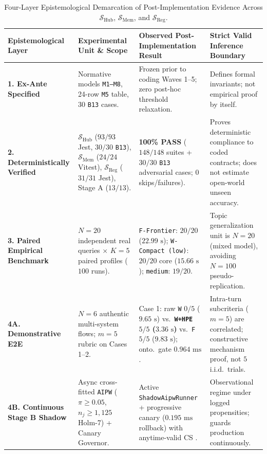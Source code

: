 \documentclass[10pt,twocolumn]{article}
\begin{document}
\begin{table}[t]
\centering
\caption{Four-Layer Epistemological Demarcation of Post-Implementation Evidence Across $\mathcal{S}_{\mathrm{Hub}}$, $\mathcal{S}_{\mathrm{Mem}}$, and $\mathcal{S}_{\mathrm{Reg}}$.}
\label{tab:epistemic}
\footnotesize
\begin{tabularx}{\textwidth}{l p{3.6cm} p{4.2cm} X}
\toprule
\textbf{Epistemological Layer} & \textbf{Experimental Unit \& Scope} & \textbf{Observed Post-Implementation Result} & \textbf{Strict Valid Inference Boundary} \\
\midrule
\textbf{1. Ex-Ante Specified} & Normative models \texttt{M1--M8}, 24-row \texttt{M5} table, 30 \texttt{B13} cases. & Frozen prior to coding Waves 1--5; zero post-hoc threshold relaxation. & Defines formal invariants; not empirical proof by itself. \\
\addlinespace[2pt]
\textbf{2. Deterministically Verified} & $\mathcal{S}_{\mathrm{Hub}}$ ($93/93$ Jest, $30/30$ \texttt{B13}), $\mathcal{S}_{\mathrm{Mem}}$ ($24/24$ Vitest), $\mathcal{S}_{\mathrm{Reg}}$ ($31/31$ Jest), Stage A ($13/13$). & \textbf{100\% PASS} ($148/148$ suites + $30/30$ \texttt{B13} adversarial cases; $0$ skips/failures). & Proves deterministic compliance to coded contracts; does not estimate open-world unseen accuracy. \\
\addlinespace[2pt]
\textbf{3. Paired Empirical Benchmark} & $N=20$ independent real queries $\times$ $K=5$ paired profiles ($100$ runs). & \texttt{F-Frontier}: $20/20$ ($22.99\text{ s}$); \texttt{W-Compact (low)}: $20/20$ core ($15.66\text{ s}$); \texttt{medium}: $19/20$. & Topic generalization unit is $N=20$ (mixed model), avoiding $N=100$ pseudo-replication. \\
\addlinespace[2pt]
\textbf{4A. Demonstrative E2E} & $N=6$ authentic multi-system flows; $m=5$ rubric on Cases 1--2. & Case 1: raw \texttt{W} $0/5$ ($9.65\text{ s}$) vs.\ \textbf{\texttt{W+HPE} $5/5$ ($3.36\text{ s}$)} vs.\ \texttt{F} $5/5$ ($9.83\text{ s}$); onto.\ gate $0.964\text{ ms}$. & Intra-turn subcriteria ($m=5$) are correlated; constructive mechanism proof, not $5$ i.i.d.\ trials. \\
\addlinespace[2pt]
\textbf{4B. Continuous Stage B Shadow} & Async cross-fitted \texttt{AIPW} ($\pi \ge 0.05$, $n_j \ge 1{,}125$ Holm-7) + Canary Governor. & Active \texttt{ShadowAipwRunner} + progressive canary ($0.195\text{ ms}$ rollback) with anytime-valid CS \cite{howard2021time}. & Observational regime under logged propensities; guards production continuously. \\
\bottomrule
\end{tabularx}
\end{table}
\end{document}

